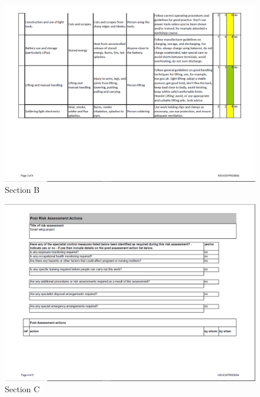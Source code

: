 \begin{figure}
\centering
\includegraphics[scale=0.6]{ra3.png}
\caption{Section B}
\centering
\end{figure}
\newpage
\begin{figure}
\centering
\includegraphics[scale=0.6]{ra4.png}
\caption{Section C}
\centering
\end{figure}

